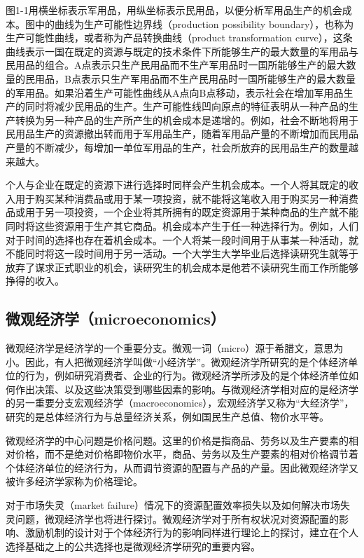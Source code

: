 图1-1用横坐标表示军用品，用纵坐标表示民用品，以便分析军用品生产的机会成本。图中的曲线为{\hei 生产可能性边界线}（production possibility boundary），也称为{\hei 生产可能性曲线}，或者称为{\hei 产品转换曲线}（product transformation curve），这条曲线表示一国在既定的资源与既定的技术条件下所能够生产的最大数量的军用品与民用品的组合。A点表示只生产民用品而不生产军用品时一国所能够生产的最大数量的民用品，B点表示只生产军用品而不生产民用品时一国所能够生产的最大数量的军用品。如果沿着生产可能性曲线从A点向B点移动，表示社会在增加军用品生产的同时将减少民用品的生产。生产可能性线凹向原点的特征表明从一种产品的生产转换为另一种产品的生产所产生的机会成本是递增的。例如，社会不断地将用于民用品生产的资源撤出转而用于军用品生产，随着军用品产量的不断增加而民用品产量的不断减少，每增加一单位军用品的生产，社会所放弃的民用品生产的数量越来越大。

个人与企业在既定的资源下进行选择时同样会产生机会成本。一个人将其既定的收入用于购买某种消费品或用于某一项投资，就不能将这笔收入用于购买另一种消费品或用于另一项投资，一个企业将其所拥有的既定资源用于某种商品的生产就不能同时将这些资源用于生产其它商品。机会成本产生于任一种选择行为。例如，人们对于时间的选择也存在着机会成本。一个人将某一段时间用于从事某一种活动，就不能同时将这一段时间用于另一活动。一个大学生大学毕业后选择读研究生就等于放弃了谋求正式职业的机会，读研究生的机会成本是他若不读研究生而工作所能够挣得的收入。

\subsection{微观经济学（microeconomics）}

微观经济学是经济学的一个重要分支。微观一词（micro）源于希腊文，意思为小。因此，有人把微观经济学叫做“小经济学”。微观经济学所研究的是个体经济单位的行为，例如研究消费者、企业的行为。微观经济学所涉及的是个体经济单位如何作出决策、以及这些决策受到哪些因素的影响。与微观经济学相对应的是经济学的另一重要分支宏观经济学（macroeconomics），宏观经济学又称为“大经济学”，研究的是总体经济行为与总量经济关系，例如国民生产总值、物价水平等。

微观经济学的中心问题是{\hei 价格问题}。这里的{\hei 价格}是指商品、劳务以及生产要素的相对价格，而不是绝对价格即物价水平，商品、劳务以及生产要素的相对价格调节着个体经济单位的经济行为，从而调节资源的配置与产品的产量。因此微观经济学又被许多经济学家称为价格理论。

对于{\hei 市场失灵}（market failure）情况下的资源配置效率损失以及如何解决市场失灵问题，微观经济学也将进行探讨。微观经济学对于所有权状况对资源配置的影响、激励机制的设计对于个体经济行为的影响同样进行理论上的探讨，建立在个人选择基础之上的公共选择也是微观经济学研究的重要内容。

